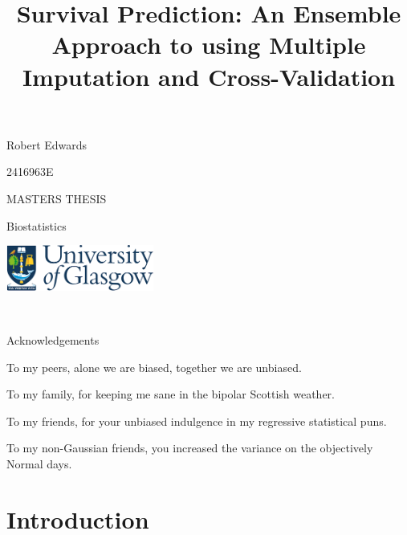 \documentclass[12pt,]{article}
\title{Survival Prediction: An Ensemble Approach to using Multiple Imputation
and Cross-Validation}
\author{}
\date{}
\begin{document}
\maketitle

\vspace{4cm}

\begin{center}
Robert Edwards 

\vspace{0.125cm}
2416963E


\vspace{1cm}
MASTERS THESIS 

\vspace{0.125cm}
Biostatistics

\vspace{9cm}
  \includegraphics[height = 1.5cm]{images/GUlogo.png}
\end{center}

\newpage

\begin{center}
~
 
\vspace{5cm}
Acknowledgements 

\vspace{3cm}
To my peers, alone we are biased, together we are unbiased.

\vspace{1cm}
To my family, for keeping me sane in the bipolar Scottish weather. 

\vspace{1cm}
To my friends, for your unbiased indulgence in my regressive statistical puns. 

\vspace{1cm}
To my non-Gaussian friends, you increased the variance on the objectively Normal days. 

\end{center}

\newpage 

\setcounter{tocdepth}{2} \tableofcontents  

\newpage

\section{Introduction}\label{introduction}
\end{document}
